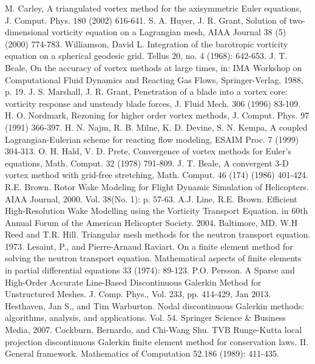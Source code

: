 \documentclass[letterpaper,12pt]{report}
\begin{document}
\begin{thebibliography}{8}
M. Carley, A triangulated vortex method for the axisymmetric Euler equations, J. Comput. Phys. 180 (2002) 616-641.
S. A. Huyer, J. R. Grant, Solution of two-dimensional vorticity equation on a Lagrangian mesh, AIAA Journal 38 (5) (2000) 774-783.
Williamson, David L. Integration of the barotropic vorticity equation on a spherical geodesic grid. Tellus 20, no. 4 (1968): 642-653.
J. T. Beale, On the accuracy of vortex methods at large times, in: IMA Workshop on Computational Fluid Dynamics and Reacting Gas Flows, Springer-Verlag, 1988, p. 19.
J. S. Marshall, J. R. Grant, Penetration of a blade into a vortex core: vorticity response and unsteady blade forces, J. Fluid Mech. 306 (1996) 83-109.
H. O. Nordmark, Rezoning for higher order vortex methods, J. Comput. Phys. 97 (1991) 366-397.
H. N. Najm, R. B. Milne, K. D. Devine, S. N. Kempa, A coupled Lagrangian-Eulerian scheme for reacting flow modeling, ESAIM Proc. 7 (1999) 304-313.
O. H. Hald, V. D. Prete, Convergence of vortex methods for Euler's equations, Math. Comput. 32 (1978) 791-809.
J. T. Beale, A convergent 3-D vortex method with grid-free stretching, Math. Comput. 46 (174) (1986) 401-424.
 R.E. Brown. Rotor Wake Modeling for Flight Dynamic Simulation of Helicopters. AIAA Journal, 2000. Vol. 38(No. 1): p. 57-63.
A.J. Line, R.E. Brown. Efficient High-Resolution Wake Modelling using the Vorticity Transport Equation. in 60th Annual Forum of the American Helicopter Society. 2004. Baltimore, MD.
W.H Reed and T.R. Hill. Triangular mesh methods for the neutron transport equation. 1973.
Lesaint, P., and Pierre-Arnaud Raviart. On a finite element method for solving the neutron transport equation. Mathematical aspects of finite elements in partial differential equations 33 (1974): 89-123.
P.O. Persson. A Sparse and High-Order Accurate Line-Based Discontinuous Galerkin Method for Unstructured Meshes. J. Comp. Phys., Vol. 233, pp. 414-429, Jan 2013.
Hesthaven, Jan S., and Tim Warburton. Nodal discontinuous Galerkin methods: algorithms, analysis, and applications. Vol. 54. Springer Science \& Business Media, 2007.
Cockburn, Bernardo, and Chi-Wang Shu. TVB Runge-Kutta local projection discontinuous Galerkin finite element method for conservation laws. II. General framework. Mathematics of Computation 52.186 (1989): 411-435.

\end{thebibliography}
\end{document}
